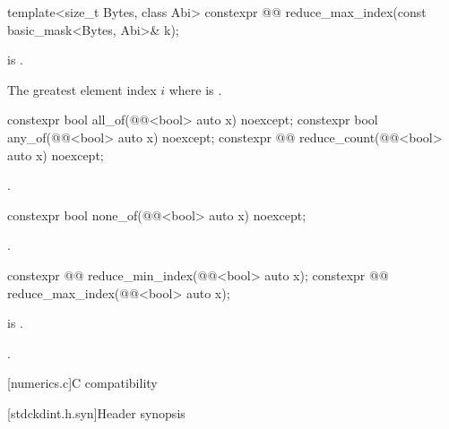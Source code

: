 \begin{itemdecl}
template<size_t Bytes, class Abi>
  constexpr @@ reduce_max_index(const basic_mask<Bytes, Abi>& k);
\end{itemdecl}

\begin{itemdescr}
\pnum
\expects
{} is .

\pnum
\returns
The greatest element index $i$ where  is .
\end{itemdescr}

\begin{itemdecl}
constexpr bool all_of(@@<bool> auto x) noexcept;
constexpr bool any_of(@@<bool> auto x) noexcept;
constexpr @@ reduce_count(@@<bool> auto x) noexcept;
\end{itemdecl}

\begin{itemdescr}
\pnum
\returns
{}.
\end{itemdescr}

\begin{itemdecl}
constexpr bool none_of(@@<bool> auto x) noexcept;
\end{itemdecl}

\begin{itemdescr}
\pnum
\returns
{}.
\end{itemdescr}

\begin{itemdecl}
constexpr @@ reduce_min_index(@@<bool> auto x);
constexpr @@ reduce_max_index(@@<bool> auto x);
\end{itemdecl}

\begin{itemdescr}
\pnum
\expects
{} is .

\pnum
\returns
{}.
\end{itemdescr}

[numerics.c]{C compatibility}

[stdckdint.h.syn]{Header  synopsis}

